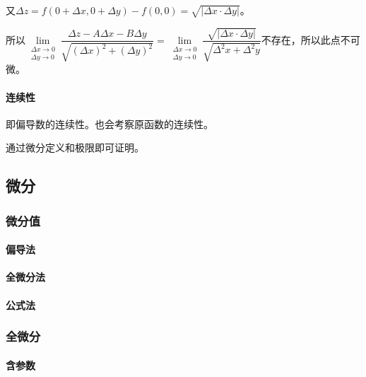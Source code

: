 \documentclass[UTF8, 12pt]{ctexart}
\begin{document}
又$\Delta z=f(0+\Delta x,0+\Delta y)-f(0,0)=\sqrt{\vert\Delta x\cdot\Delta y\vert}$。

所以$\lim\limits_{\substack{\Delta x\to0\\\Delta y\to0}}\dfrac{\Delta z-A\Delta x-B\Delta y}{\sqrt{(\Delta x)^2+(\Delta y)^2}}=\lim\limits_{\substack{\Delta x\to0\\\Delta y\to0}}\dfrac{\sqrt{\vert\Delta x\cdot\Delta y\vert}}{\sqrt{\Delta^2x+\Delta^2y}}$不存在，所以此点不可微。

\paragraph{连续性} \leavevmode \medskip

即偏导数的连续性。也会考察原函数的连续性。

通过微分定义和极限即可证明。


\subsection{微分}

\subsubsection{微分值}

\paragraph{偏导法} \leavevmode \medskip

\paragraph{全微分法} \leavevmode \medskip

\paragraph{公式法} \leavevmode \medskip

\subsubsection{全微分}

\paragraph{含参数} \leavevmode \medskip
\end{document}
